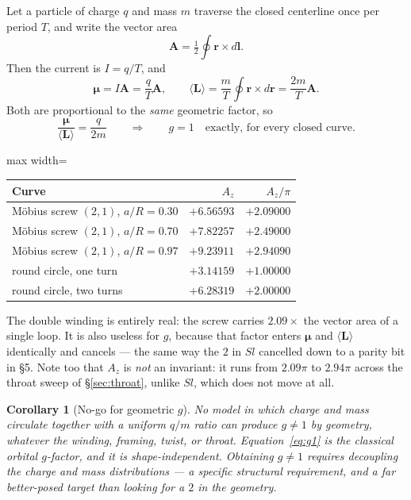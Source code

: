 \documentclass[11pt,a4paper]{article}
\newtheorem{corollary}{Corollary}
\begin{document}
Let a particle of charge $q$ and mass $m$ traverse the closed centerline
once per period $T$, and write the vector area
\begin{equation}
\bm{A} = \tfrac{1}{2}\oint \bm{r}\times d\bm{l}.
\end{equation}
Then the current is $I = q/T$, and
\begin{equation}
\bm{\mu} = I\bm{A} = \frac{q}{T}\bm{A},
\qquad
\langle \bm{L}\rangle = \frac{m}{T}\oint \bm{r}\times d\bm{r}
                      = \frac{2m}{T}\bm{A}.
\end{equation}
Both are proportional to the \emph{same} geometric factor, so
\begin{equation}
\label{eq:g1}
\frac{\bm{\mu}}{\langle\bm{L}\rangle} = \frac{q}{2m}
\qquad\Longrightarrow\qquad
g = 1 \quad\text{exactly, for every closed curve.}
\end{equation}

\begin{center}
\begin{adjustbox}{max width=\linewidth}\begin{tabular}{@{}lrr@{}}
\toprule
Curve & $A_z$ & $A_z/\pi$ \\
\midrule
M\"obius screw $(2,1)$, $a/R = 0.30$ & $+6.56593$ & $+2.09000$ \\
M\"obius screw $(2,1)$, $a/R = 0.70$ & $+7.82257$ & $+2.49000$ \\
M\"obius screw $(2,1)$, $a/R = 0.97$ & $+9.23911$ & $+2.94090$ \\
round circle, one turn               & $+3.14159$ & $+1.00000$ \\
round circle, two turns              & $+6.28319$ & $+2.00000$ \\
\bottomrule
\end{tabular}\end{adjustbox}
\end{center}

The double winding is entirely real: the screw carries $2.09\times$ the
vector area of a single loop.  It is also useless for $g$, because that
factor enters $\bm{\mu}$ and $\langle\bm{L}\rangle$ identically and
cancels --- the same way the $2$ in $Sl$ cancelled down to a parity bit in
\S5.  Note too that $A_z$ is \emph{not} an invariant: it runs from
$2.09\pi$ to $2.94\pi$ across the throat sweep of \S\ref{sec:throat},
unlike $Sl$, which does not move at all.

\begin{corollary}[No-go for geometric $g$]
\label{cor:nogo}
No model in which charge and mass circulate together with a uniform
$q/m$ ratio can produce $g \neq 1$ by geometry, whatever the winding,
framing, twist, or throat.  Equation~\eqref{eq:g1} is the classical
orbital $g$-factor, and it is shape-independent.  Obtaining $g \neq 1$
requires \emph{decoupling the charge and mass distributions} --- a
specific structural requirement, and a far better-posed target than
looking for a $2$ in the geometry.
\end{corollary}
\end{document}
